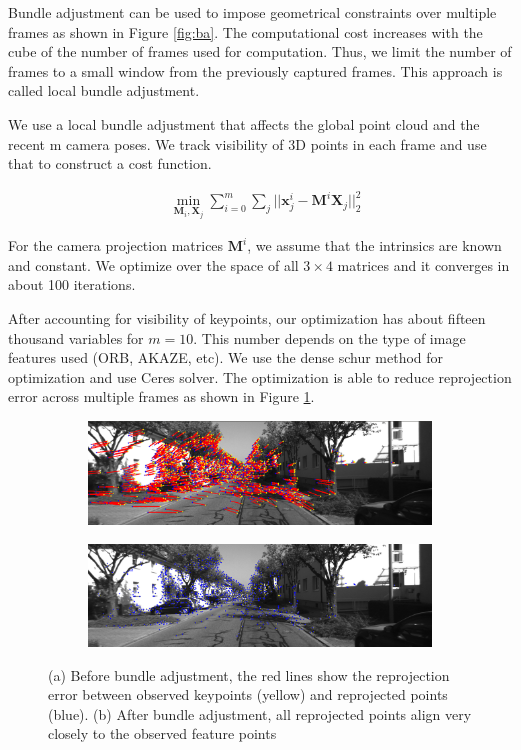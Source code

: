 \documentclass{article}
\begin{document}
Bundle adjustment can be used to impose geometrical constraints over multiple frames as shown in Figure \ref{fig:ba}. The computational cost increases with the cube of the number of frames used for computation. Thus, we limit the number of frames to a small window from the previously captured frames. This approach is called local bundle adjustment.

We use a local bundle adjustment that affects the global point cloud and the recent m camera poses. We track visibility of 3D points in each frame and use that to construct a cost function. 

\begin{align*}
    &\min_{\textbf{M}_i, \textbf{X}_j} \sum_{i=0}^{m} \sum_j || \textbf{x}^{i}_{j} - \textbf{M}^{i} \textbf{X}_j||^{2}_{2}
\end{align*}

For the camera projection matrices $\textbf{M}^{i}$, we assume that the intrinsics are known and constant. We optimize over the space of all $3 \times 4$ matrices and it converges in about 100 iterations.

After accounting for visibility of keypoints, our optimization has about fifteen thousand variables for $m = 10$. This number depends on the type of image features used (ORB, AKAZE, etc). We use the dense schur method for optimization and use Ceres solver\cite{ceres-solver}. The optimization is able to reduce reprojection error across multiple frames as shown in Figure \ref{fig:reproj}.

\begin{figure}
    \centering
    \begin{subfigure}[b]{.45\textwidth}
        \includegraphics[width=\linewidth]{./before-ba.png}
        \caption{}
    \end{subfigure}
    \begin{subfigure}[b]{.45\textwidth}
        \includegraphics[width=\linewidth]{./after-ba.png}
        \caption{}
    \end{subfigure}
    \caption{(a) Before bundle adjustment, the red lines show the reprojection error between observed keypoints (yellow) and reprojected points (blue). (b) After bundle adjustment, all reprojected points align very closely to the observed feature points}
    \label{fig:reproj}
\end{figure}
\end{document}
